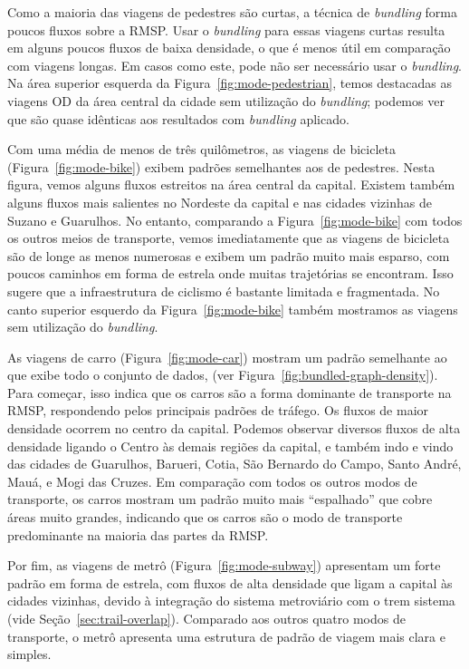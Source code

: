 Como a maioria das viagens de pedestres são curtas, a técnica de \emph{bundling}
forma poucos fluxos sobre a RMSP. Usar o \emph{bundling} para essas viagens
curtas resulta em alguns poucos fluxos de baixa densidade, o que é menos útil em
comparação com viagens longas. Em casos como este, pode não ser necessário usar
o \emph{bundling}. Na área superior esquerda da
Figura~\ref{fig:mode-pedestrian}, temos destacadas as viagens OD da área central da
cidade sem utilização do \emph{bundling}; podemos ver que são quase idênticas
aos resultados com \emph{bundling} aplicado.

Com uma média de menos de três quilômetros, as viagens de bicicleta
(Figura~\ref{fig:mode-bike}) exibem padrões semelhantes aos de pedestres.  Nesta
figura, vemos alguns fluxos estreitos na área central da capital. Existem também
alguns fluxos mais salientes no Nordeste da capital e nas cidades vizinhas de
Suzano e Guarulhos. No entanto, comparando a Figura~\ref{fig:mode-bike} com
todos os outros meios de transporte, vemos imediatamente que as viagens de
bicicleta são de longe as menos numerosas e exibem um padrão muito mais esparso,
com poucos caminhos em forma de estrela onde muitas trajetórias se encontram.
Isso sugere que a infraestrutura de ciclismo é bastante limitada e fragmentada.
No canto superior esquerdo da Figura~\ref{fig:mode-bike} também mostramos
as viagens sem utilização do \emph{bundling}.

As viagens de carro (Figura~\ref{fig:mode-car}) mostram um padrão
semelhante ao que exibe todo o conjunto de dados, (ver Figura~\ref{fig:bundled-graph-density}).
Para começar, isso indica que os carros são a forma
dominante de transporte na RMSP, respondendo pelos principais padrões de
tráfego. Os fluxos de maior densidade ocorrem no centro da capital. Podemos observar diversos
fluxos de alta densidade ligando o Centro às demais regiões da capital, e também
indo e vindo das cidades de Guarulhos, Barueri, Cotia, São Bernardo do Campo,
Santo André, Mauá, e Mogi das Cruzes. Em comparação com todos os outros
modos de transporte, os carros mostram um padrão muito mais ``espalhado'' que
cobre áreas muito grandes, indicando que os carros são o modo de transporte
predominante na maioria das partes da RMSP.

Por fim, as viagens de metrô (Figura~\ref{fig:mode-subway}) apresentam um forte
padrão em forma de estrela, com fluxos de alta densidade que ligam a capital às
cidades vizinhas, devido à integração do sistema metroviário com o trem sistema
(vide Seção~\ref{sec:trail-overlap}). Comparado aos outros quatro modos de
transporte, o metrô apresenta uma estrutura de padrão de viagem mais clara e
simples.

